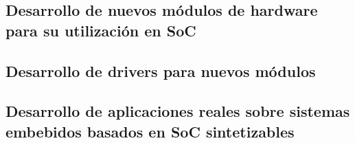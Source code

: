 		\subsection{Desarrollo de nuevos módulos de hardware para su utilización en SoC}
		
		\subsection{Desarrollo de drivers para nuevos módulos}
		
		\subsection{Desarrollo de aplicaciones reales sobre sistemas embebidos basados en SoC sintetizables}
		
		
	
	 